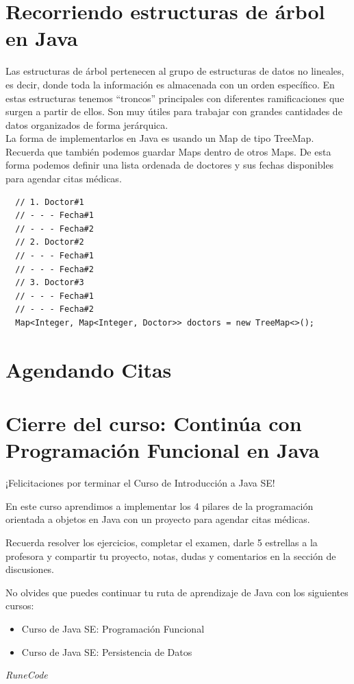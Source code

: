 \documentclass{article}
\begin{document}
\section{Recorriendo estructuras de árbol en Java}%
Las estructuras de árbol pertenecen al grupo de estructuras de datos no
lineales, es decir, donde toda la información es almacenada con un orden
específico. En estas estructuras tenemos “troncos” principales con diferentes
ramificaciones que surgen a partir de ellos. Son muy útiles para trabajar con
grandes cantidades de datos organizados de forma jerárquica.\\

La forma de implementarlos en Java es usando un Map de tipo TreeMap. Recuerda
que también podemos guardar Maps dentro de otros Maps. De esta forma podemos
definir una lista ordenada de doctores y sus fechas disponibles para agendar
citas médicas.\\

\begin{verbatim}
  // 1. Doctor#1
  // - - - Fecha#1
  // - - - Fecha#2
  // 2. Doctor#2
  // - - - Fecha#1
  // - - - Fecha#2
  // 3. Doctor#3
  // - - - Fecha#1
  // - - - Fecha#2
  Map<Integer, Map<Integer, Doctor>> doctors = new TreeMap<>();
\end{verbatim}

\section{Agendando Citas}%


\section{Cierre del curso: Continúa con Programación Funcional en Java}%
¡Felicitaciones por terminar el Curso de Introducción a Java SE!

En este curso aprendimos a implementar los 4 pilares de la programación
orientada a objetos en Java con un proyecto para agendar citas médicas.

Recuerda resolver los ejercicios, completar el examen, darle 5 estrellas a la
profesora y compartir tu proyecto, notas, dudas y comentarios en la sección de
discusiones.

No olvides que puedes continuar tu ruta de aprendizaje de Java con los
siguientes cursos:

\begin{itemize}
  \item Curso de Java SE: Programación Funcional
  \item Curso de Java SE: Persistencia de Datos
\end{itemize}



































\vspace{2cm}
\LARGE\textit{RuneCode}
\end{document}
